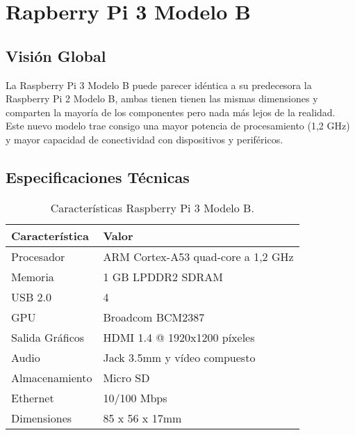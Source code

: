 \chapter{Rapberry Pi 3 Modelo B}
\label{chap:anexo6}

\section{Visión Global}

La Raspberry Pi 3 Modelo B puede parecer idéntica a su predecesora la Raspberry Pi 2 Modelo B, ambas tienen tienen las mismas dimensiones y comparten la mayoría de los componentes pero nada más lejos de la realidad. Este nuevo modelo trae consigo una mayor potencia de procesamiento (1,2 GHz) y mayor capacidad de conectividad con dispositivos y periféricos.

\section{Especificaciones Técnicas}

\begin{table}[h!]
  \centering
  \caption{Características Raspberry Pi 3 Modelo B. \cite{RaspberryPi3}}
  \label{tab:raspberrypi3}
  \begin{tabular}{p{}p{}}
    \hline
    \textbf{Característica} & \textbf{Valor} \\
    \hline
    Procesador & ARM Cortex-A53 quad-core a 1,2 GHz\\
    Memoria & 1 GB LPDDR2 SDRAM \\
    USB 2.0 & 4 \\
    GPU & Broadcom BCM2387 \\
    Salida Gráficos & HDMI 1.4 @ 1920x1200 píxeles \\
    Audio & Jack 3.5mm y vídeo compuesto \\
    Almacenamiento & Micro SD \\
    Ethernet & 10/100 Mbps \\
    Dimensiones & 85 x 56 x 17mm \\
    \hline
  \end{tabular}
\end{table}